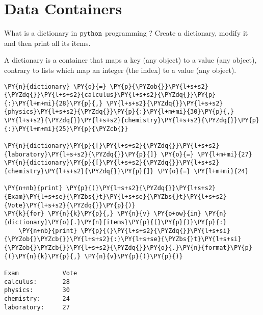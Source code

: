 \chapter{Data Containers}\label{introduction-to-python---lesson-2}

\begin{Exercise}
What is a dictionary in \(\tt{python}\) programming ? Create a dictionary, modify it and then print all its items.
\end{Exercise}

\begin{Answer}
A dictionary is a container that maps a key (any object) to a value (any
object), contrary to lists which map an integer (the index) to a value
(any object).

\begin{tcolorbox}[size=fbox, boxrule=1pt, colback=cellbackground, colframe=cellborder]
\begin{Verbatim}[commandchars=\\\{\}]
\PY{n}{dictionary} \PY{o}{=} \PY{p}{\PYZob{}}\PY{l+s+s2}{\PYZdq{}}\PY{l+s+s2}{calculus}\PY{l+s+s2}{\PYZdq{}}\PY{p}{:}\PY{l+m+mi}{28}\PY{p}{,} \PY{l+s+s2}{\PYZdq{}}\PY{l+s+s2}{physics}\PY{l+s+s2}{\PYZdq{}}\PY{p}{:}\PY{l+m+mi}{30}\PY{p}{,} \PY{l+s+s2}{\PYZdq{}}\PY{l+s+s2}{chemistry}\PY{l+s+s2}{\PYZdq{}}\PY{p}{:}\PY{l+m+mi}{25}\PY{p}{\PYZcb{}}

\PY{n}{dictionary}\PY{p}{[}\PY{l+s+s2}{\PYZdq{}}\PY{l+s+s2}{laboratory}\PY{l+s+s2}{\PYZdq{}}\PY{p}{]} \PY{o}{=} \PY{l+m+mi}{27}
\PY{n}{dictionary}\PY{p}{[}\PY{l+s+s2}{\PYZdq{}}\PY{l+s+s2}{chemistry}\PY{l+s+s2}{\PYZdq{}}\PY{p}{]} \PY{o}{=} \PY{l+m+mi}{24}

\PY{n+nb}{print} \PY{p}{(}\PY{l+s+s2}{\PYZdq{}}\PY{l+s+s2}{Exam}\PY{l+s+se}{\PYZbs{}t}\PY{l+s+se}{\PYZbs{}t}\PY{l+s+s2}{Vote}\PY{l+s+s2}{\PYZdq{}}\PY{p}{)}
\PY{k}{for} \PY{n}{k}\PY{p}{,} \PY{n}{v} \PY{o+ow}{in} \PY{n}{dictionary}\PY{o}{.}\PY{n}{items}\PY{p}{(}\PY{p}{)}\PY{p}{:}
    \PY{n+nb}{print} \PY{p}{(}\PY{l+s+s2}{\PYZdq{}}\PY{l+s+si}{\PYZob{}\PYZcb{}}\PY{l+s+s2}{:}\PY{l+s+se}{\PYZbs{}t}\PY{l+s+si}{\PYZob{}\PYZcb{}}\PY{l+s+s2}{\PYZdq{}}\PY{o}{.}\PY{n}{format}\PY{p}{(}\PY{n}{k}\PY{p}{,} \PY{n}{v}\PY{p}{)}\PY{p}{)}

Exam            Vote
calculus:       28
physics:        30
chemistry:      24
laboratory:     27
\end{Verbatim}
\end{tcolorbox}
\end{Answer}


